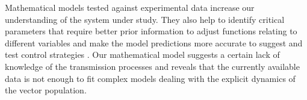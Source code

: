 Mathematical models tested against experimental data increase our understanding
of the system under study. They also help to identify critical
parameters that require better prior information to adjust functions relating
to different variables and make the model predictions more accurate to suggest
and test control strategies \cite{cunniffe2015thirteen, jeger2018plant}. Our
mathematical model suggests a certain lack of knowledge of the transmission
processes and reveals that the currently available data is not enough to fit
complex models dealing with the explicit dynamics of the vector population.
